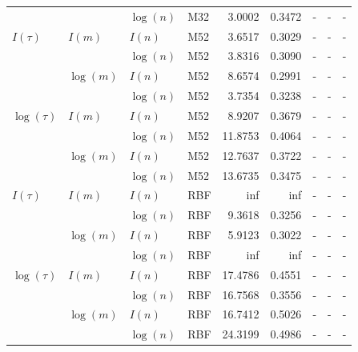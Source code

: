 \begin{table}
\begin{tabularx}{1\textwidth}{|llllrr >{\raggedright\arraybackslash}X>{\raggedright\arraybackslash}X>{\raggedright\arraybackslash}X|}
   &  & $\log({n})$ & M32 & 3.0002 & 0.3472 &  - &  - & - \\
 $I({\tau})$ & $I({m})$ & $I({n})$ & M52 & 3.6517 & 0.3029 &  - &  - & - \\
   &  & $\log({n})$ & M52 & 3.8316 & 0.3090 &  - &  - & - \\
   & $\log({m})$ & $I({n})$ & M52 & 8.6574 & 0.2991 &  - &  - & - \\
   &  & $\log({n})$ & M52 & 3.7354 & 0.3238 &  - &  - & - \\
 $\log({\tau})$ & $I({m})$ & $I({n})$ & M52 & 8.9207 & 0.3679 &  - &  - & - \\
   &  & $\log({n})$ & M52 & 11.8753 & 0.4064 &  - &  - & - \\
   & $\log({m})$ & $I({n})$ & M52 & 12.7637 & 0.3722 &  - &  - & - \\
   &  & $\log({n})$ & M52 & 13.6735 & 0.3475 &  - &  - & - \\
 $I({\tau})$ & $I({m})$ & $I({n})$ & RBF & inf & inf &  - &  - & - \\
   &  & $\log({n})$ & RBF & 9.3618 & 0.3256 &  - &  - & - \\
   & $\log({m})$ & $I({n})$ & RBF & 5.9123 & 0.3022 &  - &  - & - \\
   &  & $\log({n})$ & RBF & inf & inf &  - &  - & - \\
 $\log({\tau})$ & $I({m})$ & $I({n})$ & RBF & 17.4786 & 0.4551 &  - &  - & - \\
   &  & $\log({n})$ & RBF & 16.7568 & 0.3556 &  - &  - & - \\
   & $\log({m})$ & $I({n})$ & RBF & 16.7412 & 0.5026 &  - &  - & - \\
   &  & $\log({n})$ & RBF & 24.3199 & 0.4986 &  - &  - & - \\
 \hline
 \end{tabularx}
\end{table}




